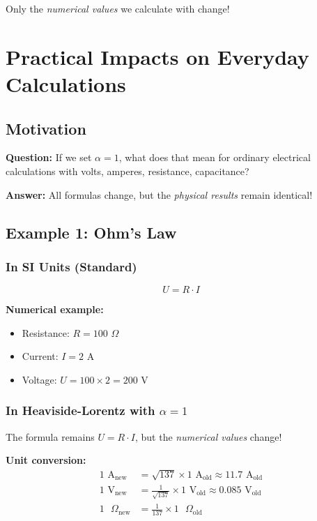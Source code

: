 	Only the \textit{numerical values} we calculate with change!
	
	\section{Practical Impacts on Everyday Calculations}
	\label{sec:practical_calculations}
	
	\subsection{Motivation}
	
	\textbf{Question:} If we set $\alpha = 1$, what does that mean for ordinary electrical calculations with volts, amperes, resistance, capacitance?
	
	\textbf{Answer:} All formulas change, but the \textit{physical results} remain identical!
	
	\subsection{Example 1: Ohm's Law}
	
	\subsubsection{In SI Units (Standard)}
	
	\begin{equation}
		U = R \cdot I
	\end{equation}
	
	\textbf{Numerical example:}
	\begin{itemize}
		\item Resistance: $R = 100$ $\Omega$
		\item Current: $I = 2$ A
		\item Voltage: $U = 100 \times 2 = 200$ V
	\end{itemize}
	
	\subsubsection{In Heaviside-Lorentz with $\alpha = 1$}
	
	The formula remains $U = R \cdot I$, but the \textit{numerical values} change!
	
	\textbf{Unit conversion:}
	\begin{align}
		1 \text{ A}_{\text{new}} &= \sqrt{137} \times 1 \text{ A}_{\text{old}} \approx 11.7 \text{ A}_{\text{old}} \\
		1 \text{ V}_{\text{new}} &= \frac{1}{\sqrt{137}} \times 1 \text{ V}_{\text{old}} \approx 0.085 \text{ V}_{\text{old}} \\
		1 \text{ }\Omega_{\text{new}} &= \frac{1}{137} \times 1 \text{ }\Omega_{\text{old}}
	\end{align}
	
